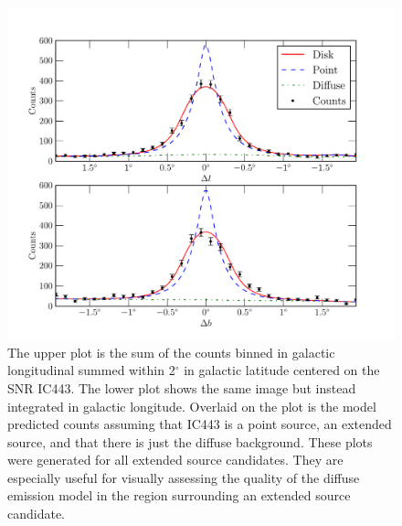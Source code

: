 \documentclass[12pt,preprint]{aastex}
\renewcommand{\deg}{\ensuremath{^\circ}\xspace}
\begin{document}
\clearpage
\begin{figure}
  \begin{center}
    \includegraphics{ic443_plots/ic443_counts_slice.pdf}
    \caption{ The upper plot is the sum of the counts binned in galactic
    longitudinal summed within 2\deg in galactic latitude centered on the
    SNR IC443. The lower plot shows the same image but instead integrated
    in galactic longitude.  Overlaid on the plot is the model predicted
    counts assuming that IC443 is a point source, an extended source, and
    that there is just the diffuse background.  These plots were generated
    for all extended source candidates.  They are especially useful for
    visually assessing the quality of the diffuse emission model in the
    region surrounding an extended source candidate.} \label{counts_slice}
  \end{center}
\end{figure}
\end{document}
